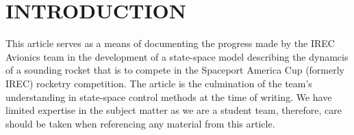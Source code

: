 \section{INTRODUCTION}

This article serves as a means of documenting the progress made by the IREC Avionics team in the development of a state-space model describing the dynamcis of a sounding rocket that is to compete in the Spaceport America Cup (formerly IREC) rocketry competition. The article is the culmination of the team's understanding in state-space control methods at the time of writing. We have limited expertise in the subject matter as we are a student team, therefore, care should be taken when referencing any material from this article.
